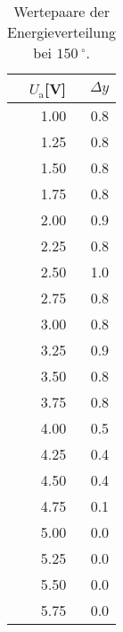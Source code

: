 
\begin{table}[!h]
\begin{center}
\begin{tabular}{|r|r|}
\hline
$U_\mathrm{a}$[V] & $\Delta y$ \\
\hline
\hline

1.00 &	0.8  \\
1.25 &	0.8  \\
1.50 &	0.8  \\
1.75 &	0.8  \\
2.00 &	0.9  \\
2.25 &	0.8  \\
2.50 &	1.0  \\
2.75 &	0.8  \\
3.00 &	0.8  \\
3.25 &	0.9  \\
3.50 &	0.8  \\
3.75 &	0.8  \\
4.00 &	0.5  \\
4.25 &	0.4  \\
4.50 &	0.4  \\
4.75 &	0.1  \\
5.00 &	0.0  \\
5.25 &	0.0  \\
5.50 &	0.0  \\
5.75 &	0.0  \\

\hline
\end{tabular}
\caption[]{Wertepaare der Energieverteilung bei $\SI{150}{^\circ}$.}
\label{tab:a1}
\end{center}
\end{table}